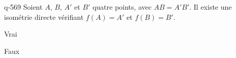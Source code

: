\begin{truefalse}{q-569}
Soient $A$, $B$, $A'$ et $B'$  quatre points, avec $AB=A'B'$. Il existe une isométrie directe vérifiant $f(A)=A'$ et $f(B)=B'$.
\item* Vrai
\item Faux
\end{truefalse}

